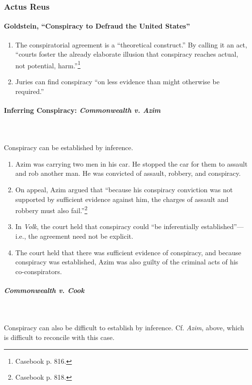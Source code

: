 \subsubsection{Actus Reus}

\paragraph{Goldstein, ``Conspiracy to Defraud the United States''}

\begin{enumerate}
    \item The conspiratorial agreement is a ``theoretical construct.'' By 
    calling it an act, ``courts foster the already elaborate illusion that 
    conspiracy reaches actual, not potential, harm.''\footnote{Casebook p.  
    816.}
    \item Juries can find conspiracy ``on less evidence than might otherwise 
    be required.''
\end{enumerate}

\paragraph{Inferring Conspiracy: \emph{Commonwealth v. Azim}}
~\\\\
Conspiracy can be established by inference.

\begin{enumerate}
    \item Azim was carrying two men in his car. He stopped the car for them to 
    assault and rob another man. He was convicted of assault, robbery, and 
    conspiracy.
    \item On appeal, Azim argued that ``because his conspiracy conviction was 
    not supported by sufficient evidence against him, the charges of assault 
    and robbery must also fail.''\footnote{Casebook p. 818.}
    \item In \emph{Volk}, the court held that conspiracy could ``be 
    inferentially established''---i.e., the agreement need not be explicit.
    \item The court held that there was sufficient evidence of conspiracy, and 
    because conspiracy was established, Azim was also guilty of the criminal
    acts of his co-conspirators.
\end{enumerate}

\paragraph{\emph{Commonwealth v. Cook}}
~\\\\
Conspiracy can also be difficult to establish by inference. Cf. \emph{Azim}, 
above, which is difficult to reconcile with this case.

